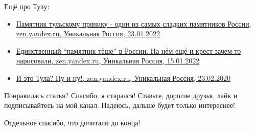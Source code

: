 Ещё про Тулу:

\begin{itemize}
\item \href{https://zen.yandex.ru/media/id/5e52a45be977e25b8eec5de4/pamiatnik-tulskomu-prianiku-odin-iz-samyh-sladkih-pamiatnikov-rossii-61ed6a1c9a54d91fbe111182}{%
Памятник тульскому прянику - один из самых сладких памятников России, %
zen.yandex.ru, Уникальная Россия, 23.01.2022%
}

\item \href{https://zen.yandex.ru/media/id/5e52a45be977e25b8eec5de4/edinstvennyi-pamiatnik-tesce-v-rossii-na-nem-esce-i-krest-zachemto-narisovali-61e1d8dbc69d7367a14a1d98}{%
Единственный \enquote{памятник тёще} в России. На нём ещё и крест зачем-то нарисовали, %
zen.yandex.ru, Уникальная Россия, 15.01.2022%
}

\item \href{https://zen.yandex.ru/media/id/5e52a45be977e25b8eec5de4/i-eto-tula-nu-i-nu-5e52ae1f5c1f4e253331ed4e}{%
И это Тула? Ну и ну!, %
zen.yandex.ru, Уникальная Россия, 23.02.2020%
}

\end{itemize}

Понравилась статья? Спасибо, я старался! Ставьте, дорогие друзья, лайк и
подписывайтесь на мой канал. Надеюсь, дальше будет только интереснее!

Отдельное спасибо, что дочитали до конца!

